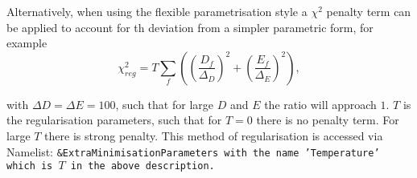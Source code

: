 \begin{description}
Alternatively, when using the flexible parametrisation style a $\chi^2$
penalty term can be applied to account for th deviation from a simpler parametric form, for example
\begin{equation}
\chi^2_{reg}= T\sum_f\left(\left(\frac{D_f}{\Delta_D}\right)^2+ \left(\frac{E_f}{\Delta_E}\right)^2\right),
\end{equation}

with $\Delta D=\Delta E = 100$, such that for large $D$ and $E$ the ratio will approach $1$. 
$T$ is the regularisation parameters, such that for $T=0$ there is no penalty term. 
For large $T$ there is strong penalty.
This method of regularisation is accessed via Namelist: \tt \&ExtraMinimisationParameters \rm
with the name \tt 'Temperature' \rm which is $T$ in the above description.

\end{description}
